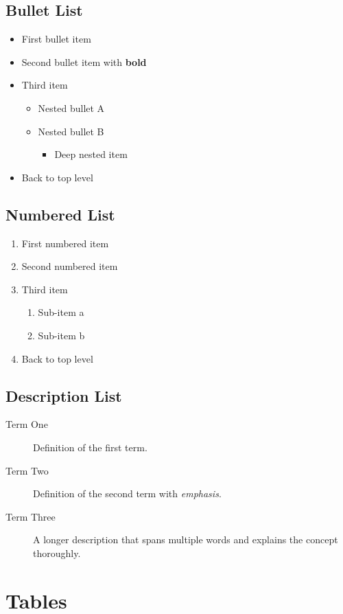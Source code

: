 \documentclass[12pt,twocolumn]{article}
\begin{document}
\subsection{Bullet List}
\begin{itemize}
\item First bullet item
\item Second bullet item with \textbf{bold}
\item Third item
  \begin{itemize}
  \item Nested bullet A
  \item Nested bullet B
    \begin{itemize}
    \item Deep nested item
    \end{itemize}
  \end{itemize}
\item Back to top level
\end{itemize}

\subsection{Numbered List}
\begin{enumerate}
\item First numbered item
\item Second numbered item
\item Third item
  \begin{enumerate}
  \item Sub-item a
  \item Sub-item b
  \end{enumerate}
\item Back to top level
\end{enumerate}

\subsection{Description List}
\begin{description}
\item[Term One] Definition of the first term.
\item[Term Two] Definition of the second term with \emph{emphasis}.
\item[Term Three] A longer description that spans multiple
  words and explains the concept thoroughly.
\end{description}

\section{Tables}
\end{document}
